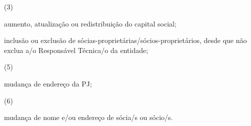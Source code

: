 \documentclass[openright, oneside, a4paper, article, brazil]{abntex2}
\begin{document}
\begin{framed}
\begin{minipage}[t]{\linewidth-\boxlarg}
\begin{minipage}[t]{\linewidth-\boxlarg}
\begin{minipage}[t]{0.8\boxlarg}
                (3)
            \end{minipage}%
            \begin{minipage}[t]{\linewidth-2\boxlarg}
                aumento, atualização ou redistribuição do capital social;
            \end{minipage}\vspace{0.5ex}
            \begin{minipage}[t]{\boxlarg}
                \raisebox{-8pt}{\fbox{\CheckBox[name=_alteracao_sociasesocios,bordercolor=black]{\null}}}
            \end{minipage}%
            \begin{minipage}[t]{0.8\boxlarg}
            \end{minipage}%
            \begin{minipage}[t]{\linewidth-2\boxlarg}
                inclusão ou exclusão de sócias-proprietárias/sócios-proprietários, desde que não exclua a/o Responsável Técnica/o da entidade;
            \end{minipage}
            \vspace{0.1ex}
            \begin{minipage}[t]{\boxlarg}
                \raisebox{-0.8pt}{\fbox{\CheckBox[name=alteracao_endereco,bordercolor=black]{\null}}}
            \end{minipage}%
            \begin{minipage}[t]{0.8\boxlarg}
                (5)
            \end{minipage}%
            \begin{minipage}[t]{\linewidth-2\boxlarg}
                mudança de endereço da PJ;
            \end{minipage}

            \vspace{-0.2ex}
            \begin{minipage}[t]{\boxlarg}
                \raisebox{-2.4pt}{\fbox{\CheckBox[name=alteracao_nome-endereco_socias,bordercolor=black]{\null}}}
            \end{minipage}%
            \begin{minipage}[t]{0.8\boxlarg}
                (6)
            \end{minipage}%
            \begin{minipage}[t]{\linewidth-2\boxlarg}
                mudança de nome e/ou endereço de sócia/s ou sócio/s.
            \end{minipage}
        \end{minipage}
        \vspace{\baselineskip}


\end{minipage}
\end{framed}
\end{document}
